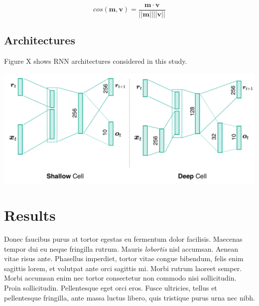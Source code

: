 \documentclass[a0,portrait]{a0poster}
\begin{document}
\begin{multicols}{2}
$$
cos(\boldsymbol{m}, \boldsymbol{v}) = \frac{ \boldsymbol{m} \cdot\boldsymbol{v} }{||\boldsymbol{m}||||\boldsymbol{v}||}
$$




\subsection*{Architectures}
Figure X shows RNN architectures considered in this study.

\begin{center}\vspace{0.5cm}
\includegraphics[width=0.7\linewidth]{architecture_with_number_neurons}
\end{center}\vspace{0.5cm}


\section*{Results}

Donec faucibus purus at tortor egestas eu fermentum dolor facilisis. Maecenas tempor dui eu neque fringilla rutrum. Mauris \emph{lobortis} nisl accumsan. Aenean vitae risus ante.
Phasellus imperdiet, tortor vitae congue bibendum, felis enim sagittis lorem, et volutpat ante orci sagittis mi. Morbi rutrum laoreet semper. Morbi accumsan enim nec tortor consectetur non commodo nisi sollicitudin. Proin sollicitudin. Pellentesque eget orci eros. Fusce ultricies, tellus et pellentesque fringilla, ante massa luctus libero, quis tristique purus urna nec nibh.


\end{multicols}
\end{document}
